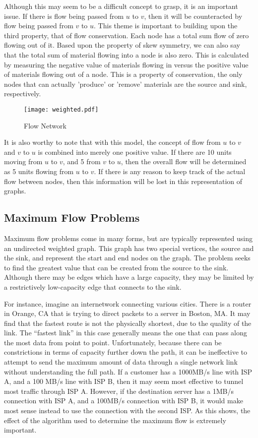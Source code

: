 \documentclass[conference]{IEEEtran}
\begin{document}
Although this may seem to be a difficult concept to grasp, it is an important issue. If there is flow being passed from $u$ to $v$, then it will be counteracted by flow being passed from $v$ to $u$. This theme is important to building upon the third property, that of flow conservation. Each node has a total sum flow of zero flowing out of it. Based upon the property of skew symmetry, we can also say that the total sum of material flowing into a node is also zero. This is calculated by measuring the negative value of materials flowing in versus the positive value of materials flowing out of a node. This is a property of conservation, the only nodes that can actually 'produce' or 'remove' materials are the source and sink, respectively.

\begin{figure}[!t]                     
\centering                             
\texttt{[image: weighted.pdf]}
\caption{Flow Network}           
\label{fig:intro}                        
\end{figure}                           

It is also worthy to note that with this model, the concept of flow from $u$ to $v$ and $v$ to $u$ is combined into merely one positive value. If there are 10 units moving from $u$ to $v$, and 5 from $v$ to $u$, then the overall flow will be determined as 5 units flowing from $u$ to $v$. If there is any reason to keep track of the actual flow between nodes, then this information will be lost in this representation of graphs.

\subsection{Maximum Flow Problems}
Maximum flow problems come in many forms, but are typically represented using an undirected weighted graph. This graph has two special vertices, the source and the sink, and represent the start and end nodes on the graph. The problem seeks to find the greatest value that can be created from the source to the sink. Although there may be edges which have a large capacity, they may be limited by a restrictively low-capacity edge that connects to the sink.

For instance, imagine an internetwork connecting various cities. There is a router in Orange, CA that is trying to direct packets to a server in Boston, MA. It may find that the fastest route is not the physically shortest, due to the quality of the link. The ``fastest link'' in this case generally means the one that can pass along the most data from point to point. Unfortunately, because there can be constrictions in terms of capacity further down the path, it can be ineffective to attempt to send the maximum amount of data through a single network link without understanding the full path. If a customer has a 1000MB/s line with ISP A, and a 100 MB/s line with ISP B, then it may seem most effective to tunnel most traffic through ISP A. However, if the destination server has a 1MB/s connection with ISP A, and a 100MB/s connection with ISP B, it would make most sense instead to use the connection with the second ISP. As this shows, the effect of the algorithm used to determine the maximum flow is extremely important.
\end{document}
